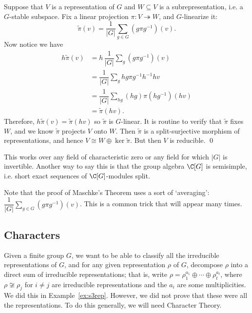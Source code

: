 \pf Suppose that $V$ is a representation of $G$ and $W \subseteq V$ is a subrepresentation, i.e. a $G$-stable subspace. Fix a linear projection $\pi: V \twoheadrightarrow W$, and $G$-linearize it:
	\[
	\widetilde{\pi}(v) = \dfrac{1}{|G|} \sum_{g \in G} (g\pi g^{-1})(v).
	\]
Now notice we have
	\[
	\begin{split}
	h\widetilde{\pi}(v)&= h\, \dfrac{1}{|G|} \sum_g (g\pi g^{-1})(v) \\
	&= \dfrac{1}{|G|} \sum_g hg\pi g^{-1}h^{-1}hv \\
	&= \dfrac{1}{|G|} \sum_{hg} (hg)\pi(hg^{-1})(hv) \\
	&= \widetilde{\pi}(hv).
	\end{split}
	\]
Therefore, $h\widetilde{\pi}(v)=\widetilde{\pi}(hv)$ so $\widetilde{\pi}$ is $G$-linear. It is routine to verify that $\widetilde{\pi}$ fixes $W$, and we know $\widetilde{\pi}$ projects $V$ onto $W$. Then $\widetilde{\pi}$ is a split-surjective morphism of representations, and hence $V \cong W \oplus \ker \widetilde{\pi}$. But then $V$ is reducible. \qed \\


\begin{rem}
This works over any field of characteristic zero or any field for which $|G|$ is invertible. Another way to say this is that the group algebra $\C[G]$ is semisimple, i.e. short exact sequences of $\C[G]$-modules split. 
\end{rem}


Note that the proof of Maschke's Theorem uses a sort of `averaging': $\displaystyle\dfrac{1}{|G|} \sum_{g \in G} (g\pi g^{-1})(v)$. This is a common trick that will appear many times. 



\subsection{Characters}

Given a finite group $G$, we want to be able to classify all the irreducible representations of $G$, and for any given representation $\rho$ of $G$, decompose $\rho$ into a direct sum of irreducible representations; that is, write $\rho= \rho_1^{a_1} \oplus \cdots \oplus \rho_t^{a_t}$, where $\rho \not\cong \rho_j$ for $i \neq j$ are irreducible representations and the $a_i$ are some multiplicities. We did this in Example~\ref{ex:s3rep}. However, we did not prove that these were all the representations. To do this generally, we will need Character Theory. 


